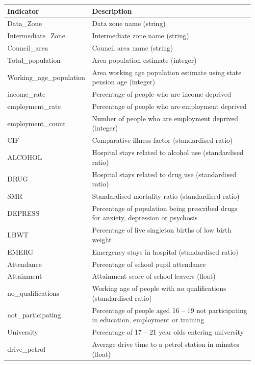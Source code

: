 \documentclass{thesis}
\begin{document}
\begin{table}[ht!]
    \centering
    \begin{tabular}{||l p{100mm}||} 
     \hline
     \textbf{Indicator} & \textbf{Description} \\ [0.5ex] 
     \hline\hline
     Data\_Zone & Data zone name (string) \\
     Intermediate\_Zone & Intermediate zone name (string) \\
     Council\_area & Council area name (string)  \\
     Total\_population & Area population estimate (integer) \\
     Working\_age\_population & Area working age population estimate using state pension age (integer) \\
     income\_rate & Percentage of people who are income deprived \\
     employment\_rate & Percentage of people who are employment deprived \\
     employment\_count & Number of people who are employment deprived (integer) \\
     CIF & Comparative illness factor (standardised ratio) \\
     ALCOHOL & Hospital stays related to alcohol use (standardised ratio) \\
     DRUG & Hospital stays related to drug use (standardised ratio) \\
     SMR & Standardised mortality ratio (standardised ratio) \\
     DEPRESS & Percentage of population being prescribed drugs for anxiety, depression or psychosis \\
     LBWT & Percentage of live singleton births of low birth weight \\
     EMERG & Emergency stays in hospital (standardised ratio) \\
     Attendance & Percentage of school pupil attendance \\
     Attainment & Attainment score of school leavers (float) \\
     no\_qualifications & Working age of people with no qualifications (standardised ratio) \\
     not\_participating & Percentage of people aged 16 -- 19 not participating in education, employment or training \\
     University & Percentage of 17 -- 21 year olds entering university \\
     drive\_petrol & Average drive time to a petrol station in minutes (float) \\

\end{tabular}
\end{table}
\end{document}
